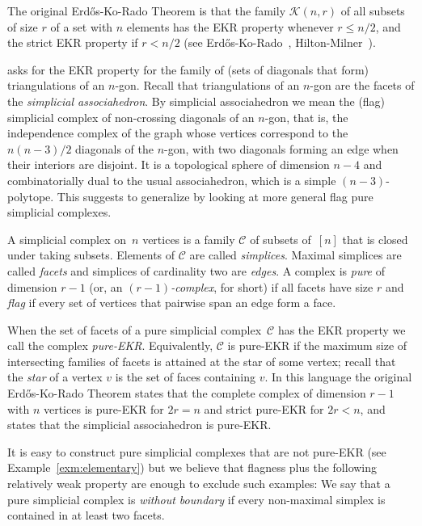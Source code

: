 \documentclass[a4paper,12pt]{amsart}
\theoremstyle{plain}
\theoremstyle{definition}
\newcommand{\darkred}{\color{darkred}} %
\newcommand{\C}{\mathcal C}
\newcommand{\K}{\mathcal K}
\newcommand{\defn}[1]{\emph{\darkred #1}} %
\begin{document}
The original Erd\H{o}s-Ko-Rado Theorem is that the family $\K(n,r)$ of all subsets of size $r$ of a set with $n$ elements has the EKR property whenever $r\le n/2$, and the strict EKR property if $r < n/2$ (see Erd\H{o}s-Ko-Rado~\cite{EKR1961}, Hilton-Milner~\cite{HM1967}). 

 asks for the EKR property for the family of (sets of diagonals that form) triangulations of an $n$-gon.
Recall that triangulations of an $n$-gon are the facets of the \defn{simplicial associahedron}. By simplicial associahedron we mean the (flag) simplicial complex of non-crossing diagonals of an $n$-gon, that is, the independence complex of the graph whose vertices correspond to the $n(n-3)/2$ diagonals of the $n$-gon, with two diagonals forming an edge when their interiors are disjoint. It is a topological sphere of dimension $n-4$ and combinatorially dual to the usual associahedron, which is a simple $(n-3)$-polytope.
This suggests to generalize  by looking at more general flag pure simplicial complexes. 

\medskip

A simplicial complex on~$n$ vertices is a family $\C$ of subsets of~$[n]$ that is closed under taking subsets. Elements of $\C$ are called \defn{simplices}. Maximal simplices are called \defn{facets} and simplices of cardinality two are  \defn{edges}.
A complex is \defn{pure} of dimension $r-1$ (or, an \defn{$(r-1)$-complex}, for short) if all facets have size $r$ and \defn{flag} if every set of vertices that pairwise span an edge form a face. 

When the set of facets of a pure simplicial complex~$\C$ has the EKR property we call the complex \defn{pure-EKR}. Equivalently, $\C$ is pure-EKR if the maximum size of intersecting families of facets is attained at the star of some vertex; recall that the \defn{star} of a vertex $v$ is the set of faces containing $v$.
In this language the original Erd\H{o}s-Ko-Rado Theorem states that the complete complex of dimension $r-1$ with $n$ vertices is pure-EKR for $2r=n$ and strict pure-EKR for $2r<n$, and  states that the simplicial associahedron is pure-EKR.

It is easy to construct pure simplicial complexes that are not pure-EKR (see Example~\ref{exm:elementary}) but we believe that flagness plus the following relatively weak property are enough to exclude such examples:
We say that a pure simplicial complex is \defn{without boundary} if every non-maximal simplex is contained in at least two facets. 
\end{document}
